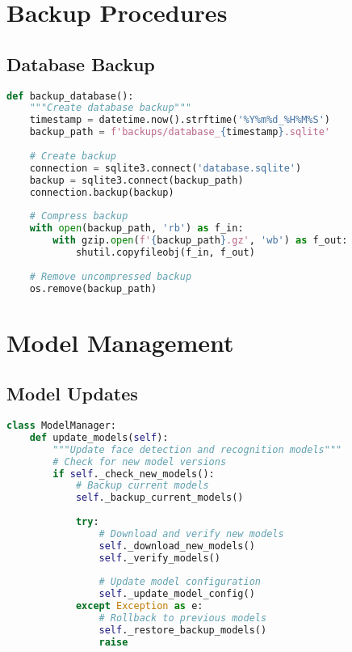 \section{Backup Procedures}

\subsection{Database Backup}
\begin{lstlisting}[language=Python]
def backup_database():
    """Create database backup"""
    timestamp = datetime.now().strftime('%Y%m%d_%H%M%S')
    backup_path = f'backups/database_{timestamp}.sqlite'
    
    # Create backup
    connection = sqlite3.connect('database.sqlite')
    backup = sqlite3.connect(backup_path)
    connection.backup(backup)
    
    # Compress backup
    with open(backup_path, 'rb') as f_in:
        with gzip.open(f'{backup_path}.gz', 'wb') as f_out:
            shutil.copyfileobj(f_in, f_out)
            
    # Remove uncompressed backup
    os.remove(backup_path)
\end{lstlisting}

\section{Model Management}

\subsection{Model Updates}
\begin{lstlisting}[language=Python]
class ModelManager:
    def update_models(self):
        """Update face detection and recognition models"""
        # Check for new model versions
        if self._check_new_models():
            # Backup current models
            self._backup_current_models()
            
            try:
                # Download and verify new models
                self._download_new_models()
                self._verify_models()
                
                # Update model configuration
                self._update_model_config()
            except Exception as e:
                # Rollback to previous models
                self._restore_backup_models()
                raise
\end{lstlisting}

